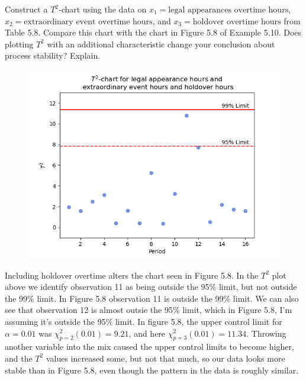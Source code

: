Construct a $T^{2}$-chart using the data on $x_{1} = \text{legal appearances overtime hours}$,
$x_{2} = \text{extraordinary event overtime hours}$, and $x_{3} = \text{holdover overtime hours}$ from
Table 5.8. Compare this chart with the chart in Figure 5.8 of Example 5.10. Does plotting
$T^{2}$ with an additional characteristic change your conclusion about process stability?
Explain.

\begin{figure}[H]
    \centering
    \includegraphics[scale=0.65]{./python/chapter-5/Question-5-26-T2.png}
\end{figure}

Including holdover overtime alters the chart seen in Figure 5.8. In the $T^{2}$ plot above we identify observation 11 as being outside the 95\% limit, but not outside the 99\% limit. In Figure 5.8 observation 11 is outside the 99\% limit. We can also see that observation 12 is almost outsie the 95\% limit, which in Figure 5.8, I'm assuming it's outside the 95\% limit. In figure 5.8, the upper control limit for $\alpha=0.01$ was $\chi_{p=2}^{2}(0.01) = 9.21$, and here $\chi_{p=3}^{2}(0.01) = 11.34$. Throwing another variable into the mix caused the upper control limits to become higher, and the $T^{2}$ values increased some, but not that much, so our data looks more stable than in Figure 5.8, even though the pattern in the data is roughly similar.
